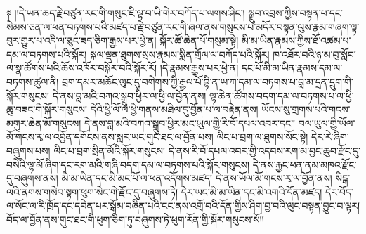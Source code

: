 \documentclass{article}
\begin{document}
༈ །།དེ་ཡན་ཆད་རྗེ་བཙུན་རང་གི་གསུང་ཇི་ལྟ་བ་ཡི་གེར་བཀོད་པ་ལགས་ཤིང་། སྒྲུབ་འབྲས་ཀྱིས་བསྟན་པ་དང་སེམས་ཅན་ལ་ཕན་བཏགས་པའི་མཛད་པ་རྗེ་བཙུན་རང་གི་ཞལ་ནས་གསུངས་པ་མདོར་བསྟན་ལུས་རྣམ་གཞག་ལྟ་བུར་གྱུར་པ་འདི་ལ་ཅུང་ཟད་ཅིག་རྒྱས་པར་ཕྱེ་ན། སྐོར་ཚོ་ཆེན་པོ་གསུམ་སྟེ། མི་མ་ཡིན་རྣམས་ཀྱིས་ཐོ་འཚམ་པ་དམ་ལ་བཏགས་པའི་སྐོར། སྐལ་ལྡན་ཐུགས་སྲས་རྣམས་སྨིན་གྲོལ་ལ་བཀོད་པའི་སྐོར། ཁ་འཐོར་བའི་ཉ་མ་བུ་སློབ་ལ་སྣ་ཚོགས་པའི་ཆོས་འཁོར་བསྐོར་བའི་སྐོར་རོ། །དེ་རྣམས་རྒྱས་པར་ཕྱེ་ན། དང་པོ་མི་མ་ཡིན་རྣམས་དམ་ལ་བཏགས་ཚུལ་ནི། བྲག་དམར་མཆོང་ལུང་དུ་བགེགས་ཀྱི་རྒྱལ་པོ་བྷི་ན་ཡ་ཀ་དམ་ལ་བཏགས་པ་བླ་མ་དྲན་དྲུག་གི་སྐོར་གསུངས། དེ་ནས་བླ་མའི་བཀའ་སྒྲུབ་ཕྱིར་ལ་ཕྱི་ལ་བྱོན་ནས། ལྷ་ཆེན་ཚོགས་བདག་དམ་ལ་བཏགས་པ་ལ་ཕྱི་ཆུ་བཟང་གི་སྐོར་གསུངས། དེའི་ཕྱི་ལོ་ལ་ཕྱི་གནས་མཐིལ་དུ་བྱོན་པ་ལ་བརྟེན་ནས། ཡོངས་སུ་གྲགས་པའི་གངས་མགུར་ཆེན་མོ་གསུངས། དེ་ནས་བླ་མའི་བཀའ་སྒྲུབ་ཕྱིར་མང་ཡུལ་གྱི་རི་བོ་དཔལ་འབར་དང་། བལ་ཡུལ་གྱི་ཡོལ་མོ་གངས་རྭ་ལ་འབྱོན་དགོངས་ནས་སླར་ཡང་གུང་ཐང་ལ་བྱོན་པས། ལིང་པ་བྲག་ལ་ཐུགས་སོང་སྟེ། དེར་རེ་ཞིག་བཞུགས་པས། ལིང་པ་བྲག་སྲིན་མོའི་སྐོར་གསུངས། དེ་ནས་རི་བོ་དཔལ་འབར་གྱི་འདབས་རག་མ་བྱང་ཆུབ་རྫོང་དུ་བསེའི་ལྷ་མོ་ཞིག་དང་རག་མའི་གཞི་བདག་དམ་ལ་བཏགས་པའི་སྐོར་གསུངས། དེ་ནས་རྐྱང་ཕན་ནམ་མཁའ་རྫོང་དུ་བཞུགས་ནས། མི་མ་ཡིན་དང་མི་མང་པོ་ལ་ཕན་འདོགས་མཛད། དེ་ནས་ཡོལ་མོ་གངས་རྭ་ལ་བྱོན་ནས། སིངྒ་ལའི་ནགས་གསེབ་སྟག་ཕུག་སེང་གེ་རྫོང་དུ་བཞུགས་ཏེ། དེར་ཡང་མི་མ་ཡིན་དང་མི་འགའི་དོན་མཛད། དེར་བོད་ལ་སོང་ལ་རི་ཁྲོད་དང་དབེན་པར་སྒོམ་བཞིན་པའི་ངང་ནས་འགྲོ་བའི་དོན་གྱིས་ཤིག་བྱ་བའི་ལུང་བསྟན་བྱུང་བ་ལྟར། བོད་ལ་བྱོན་ནས་གུང་ཐང་གི་ཕུག་ཅིག་ཏུ་བཞུགས་ཏེ་ཕུག་རོན་གྱི་སྐོར་གསུངས་སོ།།
\end{document}
